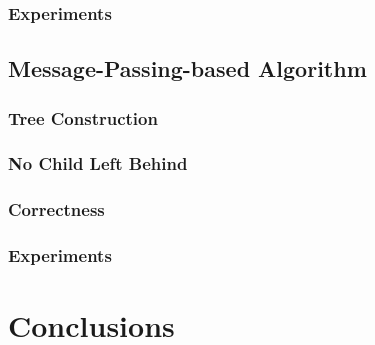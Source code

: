 \documentclass[10pt]{beamer}
\begin{document}




\subsubsection[Algorithm2: Simulation]{Experiments}









\subsection[Algorithm3]{Message-Passing-based Algorithm}



\subsubsection[Algorithm3: Tree]{Tree Construction}



\subsubsection[Algorithm3: Motion Strategy]{No Child Left Behind}





\subsubsection[Algorithm3: Correctness]{Correctness}



\subsubsection[Algorithm3: Simulation]{Experiments}















\section{Conclusions}



\end{document}
